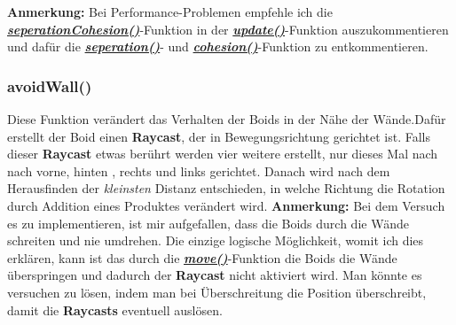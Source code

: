 \documentclass[a4paper, hidelinks, 12pt]{article}
\begin{document}
\scriptsize\textbf{Anmerkung:}
Bei Performance-Problemen empfehle ich die \hyperref[UmsetzungseperationCohesion]{\textbf{\emph{seperationCohesion()}}}-Funktion in der \hyperref[Umsetzungupdate]{\textbf{\emph{update()}}}-Funktion auszukommentieren und dafür die \hyperref[Umsetzungseperation]{\textbf{\emph{seperation()}}}- und \hyperref[Umsetzungcohesion]{\textbf{\emph{cohesion()}}}-Funktion zu entkommentieren.
\newline

		
\normalsize\subsubsection{avoidWall()}\label{UmsetzungavoidWall}
Diese Funktion verändert das Verhalten der Boids in der Nähe der Wände.\newline Dafür erstellt der Boid einen \textbf{Raycast}\cite{raycast}, der in Bewegungsrichtung gerichtet ist. Falls dieser \textbf{Raycast} etwas berührt werden vier weitere erstellt, nur dieses Mal nach nach vorne, hinten , rechts und links gerichtet. Danach wird nach dem Herausfinden der \emph{kleinsten} Distanz\cite{HitInfo} entschieden, in welche Richtung die Rotation durch Addition eines Produktes verändert wird.\newline\newline
\scriptsize\textbf{Anmerkung:} Bei dem Versuch es zu implementieren, ist mir aufgefallen, dass die Boids durch die Wände schreiten und nie umdrehen. Die einzige logische Möglichkeit, womit ich dies erklären, kann ist das durch die \hyperref[Umsetzungmove]{\textbf{\emph{move()}}}-Funktion die Boids die Wände überspringen und dadurch der \textbf{Raycast} nicht aktiviert wird. Man könnte es versuchen zu lösen, indem man bei Überschreitung die Position überschreibt, damit die \textbf{Raycasts} eventuell auslösen.
\newline\newline
	
\end{document}
